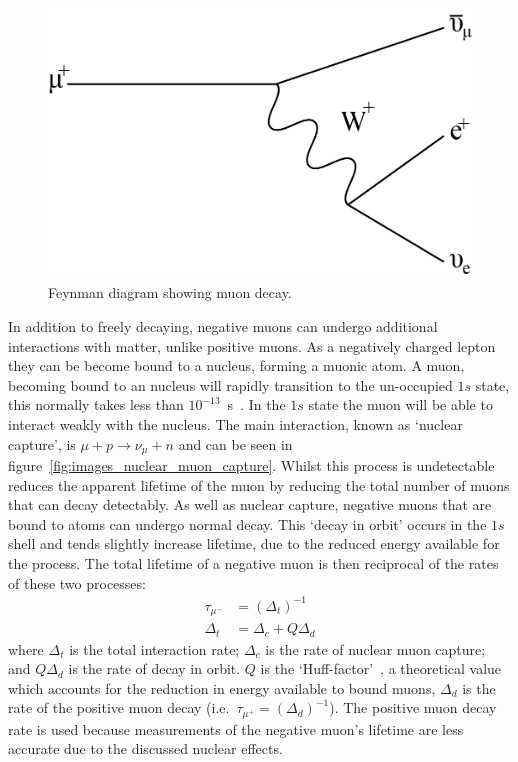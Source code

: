 \begin{figure}[hptb]
  \centering
    \includegraphics[scale=1]{images/muon_decay_feynmann.png}
  \caption{Feynman diagram showing muon decay.}
  \label{fig:muon_decay_feynmann}
\end{figure}

In addition to freely decaying, negative muons can undergo additional interactions with matter, unlike positive muons. As a negatively charged lepton they can be become bound to a nucleus, forming a muonic atom. A muon, becoming bound to an nucleus will rapidly transition to the un-occupied \(1s\) state, this normally takes less than \( 10^{-13}\)~s~\cite{review_nuclear_physics_mu_capture_measday}. In the \(1s\) state the muon will be able to interact weakly with the nucleus. The main interaction, known as `nuclear capture', is \(\mu + p \rightarrow \nu_{\mu} + n\) and can be seen in figure~\ref{fig:images_nuclear_muon_capture}. Whilst this process is undetectable reduces the apparent lifetime of the muon by reducing the total number of muons that can decay detectably. As well as nuclear capture, negative muons that are bound to atoms can undergo normal decay. This `decay in orbit' occurs in the \(1s\) shell and tends slightly increase lifetime, due to the reduced energy available for the process. The total lifetime of a negative muon is then reciprocal of the rates of these two processes:
\begin{align}
  \tau_{\mu^-} &= (\Delta_t)^{-1}\\
  \Delta_t &= \Delta_c + Q\Delta_d \label{eq:capture_rate}
\end{align}
where \( \Delta_t \) is the total interaction rate; \( \Delta_c \) is the rate of nuclear muon capture; and \(Q\Delta_d\) is the rate of decay in orbit. \(Q\) is the `Huff-factor'~\cite{huff_factor}, a theoretical value which accounts for the reduction in energy available to bound muons, \(\Delta_d\) is the rate of the positive muon decay (i.e.\ \(\tau_{\mu^+} = (\Delta_d)^{-1}\)). The positive muon decay rate is used because measurements of the negative muon's lifetime are less accurate due to the discussed nuclear effects.

